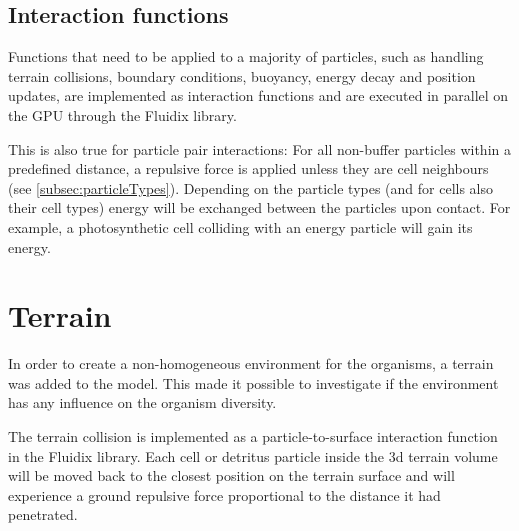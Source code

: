 \subsection{Interaction functions}
Functions that need to be applied to a majority of particles, such as handling terrain collisions, boundary conditions, buoyancy, energy decay and position updates, are implemented as interaction functions and are executed in parallel on the GPU through the Fluidix library.

This is also true for particle pair interactions: For all non-buffer particles within a predefined distance, a repulsive force is applied unless they are cell neighbours (see \ref{subsec:particleTypes}). Depending on the particle types (and for cells also their cell types) energy will be exchanged between the particles upon contact. For example, a photosynthetic cell colliding with an energy particle will gain its energy.

\section{Terrain}
In order to create a non-homogeneous environment for the organisms, a terrain was added to the model. This made it possible to investigate if the environment has any influence on the organism diversity.

The terrain collision is implemented as a particle-to-surface interaction function in the Fluidix library. Each cell or detritus particle inside the 3d terrain volume will be moved back to the closest position on the terrain surface and will experience a ground repulsive force proportional to the distance it had penetrated.

